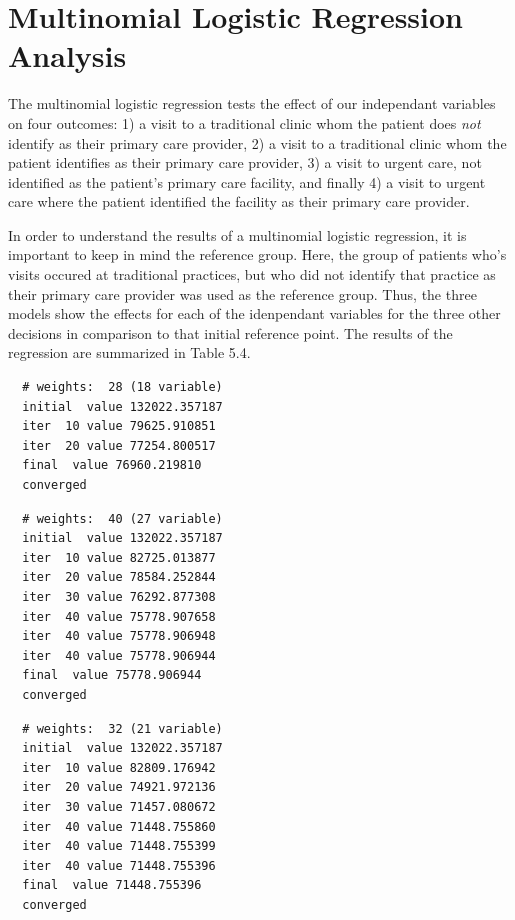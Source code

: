 \documentclass[12pt,twoside]{reedthesis}
\begin{document}
  \section*{Multinomial Logistic Regression
  Analysis}\label{multinomial-logistic-regression-analysis}
  
  The multinomial logistic regression tests the effect of our independant
  variables on four outcomes: 1) a visit to a traditional clinic whom the
  patient does \emph{not} identify as their primary care provider, 2) a
  visit to a traditional clinic whom the patient identifies as their
  primary care provider, 3) a visit to urgent care, not identified as the
  patient's primary care facility, and finally 4) a visit to urgent care
  where the patient identified the facility as their primary care
  provider.
  
  In order to understand the results of a multinomial logistic regression,
  it is important to keep in mind the reference group. Here, the group of
  patients who's visits occured at traditional practices, but who did not
  identify that practice as their primary care provider was used as the
  reference group. Thus, the three models show the effects for each of the
  idenpendant variables for the three other decisions in comparison to
  that initial reference point. The results of the regression are
  summarized in Table 5.4.
  
  \begin{verbatim}
  # weights:  28 (18 variable)
  initial  value 132022.357187 
  iter  10 value 79625.910851
  iter  20 value 77254.800517
  final  value 76960.219810 
  converged
  \end{verbatim}
  
  \begin{verbatim}
  # weights:  40 (27 variable)
  initial  value 132022.357187 
  iter  10 value 82725.013877
  iter  20 value 78584.252844
  iter  30 value 76292.877308
  iter  40 value 75778.907658
  iter  40 value 75778.906948
  iter  40 value 75778.906944
  final  value 75778.906944 
  converged
  \end{verbatim}
  
  \begin{verbatim}
  # weights:  32 (21 variable)
  initial  value 132022.357187 
  iter  10 value 82809.176942
  iter  20 value 74921.972136
  iter  30 value 71457.080672
  iter  40 value 71448.755860
  iter  40 value 71448.755399
  iter  40 value 71448.755396
  final  value 71448.755396 
  converged
  \end{verbatim}
  
\end{document}

